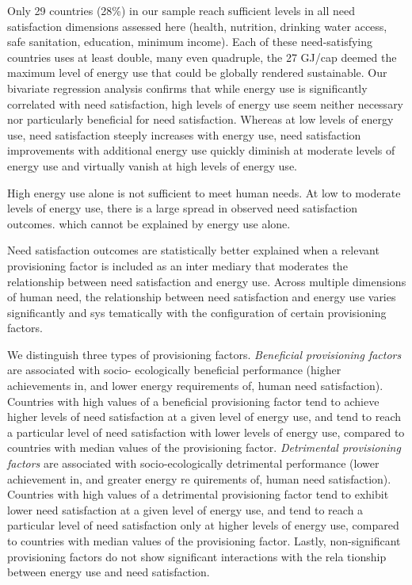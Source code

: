 \documentclass[
]{book}
\begin{document}
Only 29 countries (28\%) in our sample reach sufficient levels in all
need satisfaction dimensions assessed here (health, nutrition, drinking
water access, safe sanitation, education, minimum income). Each of
these need-satisfying countries uses at least double, many even
quadruple, the 27 GJ/cap deemed the maximum level of energy use that
could be globally rendered sustainable.
Our bivariate regression analysis confirms that while energy use is
significantly correlated with need satisfaction, high levels of energy use
seem neither necessary nor particularly beneficial for need satisfaction.
Whereas at low levels of energy use, need satisfaction steeply increases
with energy use, need satisfaction improvements with additional energy
use quickly diminish at moderate levels of energy use and virtually vanish
at high levels of energy use.

High energy use alone is not
sufficient to meet human needs. At low to moderate levels of energy use,
there is a large spread in observed need satisfaction outcomes.
which cannot be explained by energy use alone.

Need satisfaction outcomes are statistically better
explained when a relevant provisioning factor is included as an inter­
mediary that moderates the relationship between need satisfaction and
energy use. Across multiple dimensions of human need, the relationship
between need satisfaction and energy use varies significantly and sys­
tematically with the configuration of certain provisioning factors.

We distinguish three types of provisioning factors.
\emph{Beneficial provisioning factors} are associated with socio-
ecologically beneficial performance (higher achievements in, and lower
energy requirements of, human need satisfaction). Countries with high
values of a beneficial provisioning factor tend to achieve higher levels of
need satisfaction at a given level of energy use, and tend to reach a
particular level of need satisfaction with lower levels of energy use,
compared to countries with median values of the provisioning factor.
\emph{Detrimental provisioning factors} are associated with socio-ecologically
detrimental performance (lower achievement in, and greater energy re­
quirements of, human need satisfaction). Countries with high values of a
detrimental provisioning factor tend to exhibit lower need satisfaction at
a given level of energy use, and tend to reach a particular level of need
satisfaction only at higher levels of energy use, compared to countries
with median values of the provisioning factor. Lastly, non-significant
provisioning factors do not show significant interactions with the rela­
tionship between energy use and need satisfaction.
\end{document}
